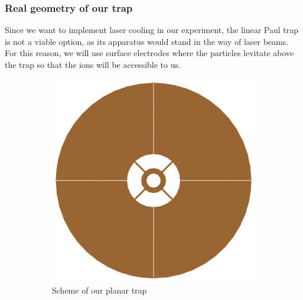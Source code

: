 \subsubsection{Real geometry of our trap}
Since we want to implement laser cooling in our experiment, the linear Paul trap is not a viable option, as its apparatus would stand in the way of laser beams. For this reason, we will use surface electrodes where the particles levitate above the trap so that the ions will be accessible to us.
\begin{figure}[H]
\begin{subfigure}{.5\textwidth}
  \centering
  \includegraphics[width=\linewidth]{img/real_trap_geometry_1.pdf}
  \caption{Scheme of our planar trap}
  \label{fig:Real trap geometry 1}
\end{subfigure}%
\begin{subfigure}{.5\textwidth}
  \centering

\end{subfigure}
\end{figure}
